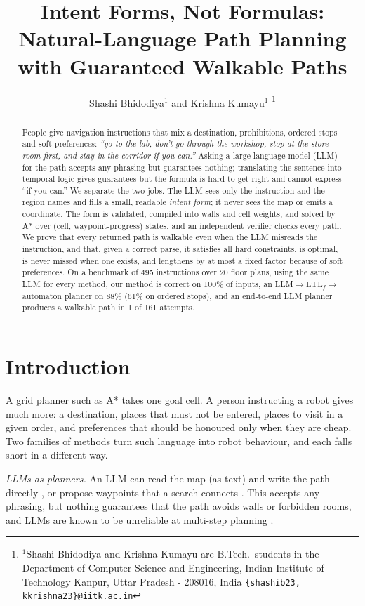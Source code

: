 \documentclass[letterpaper, 10 pt, conference]{ieeeconf}
\title{\LARGE \bf
Intent Forms, Not Formulas: Natural-Language Path Planning\\
with Guaranteed Walkable Paths
}
\author{Shashi Bhidodiya$^{1}$ and Krishna Kumayu$^{1}$%
\thanks{$^{1}$Shashi Bhidodiya and Krishna Kumayu are B.Tech.\ students in the
        Department of Computer Science and Engineering, Indian Institute of
        Technology Kanpur, Uttar Pradesh - 208016, India
        \mbox{\tt\small \{shashib23, kkrishna23\}@iitk.ac.in}}%
}
\newcommand{\Lt}{\mathrm{LTL}_f}
\begin{document}
\maketitle
\thispagestyle{empty}
\pagestyle{empty}

\begin{abstract}
People give navigation instructions that mix a destination, prohibitions, ordered
stops and soft preferences: \emph{``go to the lab, don't go through the workshop,
stop at the store room first, and stay in the corridor if you can.''} Asking a large
language model (LLM) for the path accepts any phrasing but guarantees nothing;
translating the sentence into temporal logic gives guarantees but the formula is hard
to get right and cannot express ``if you can.'' We separate the two jobs. The LLM sees
only the instruction and the region names and fills a small, readable \emph{intent
form}; it never sees the map or emits a coordinate. The form is validated, compiled
into walls and cell weights, and solved by A* over (cell, waypoint-progress) states,
and an independent verifier checks every path. We prove that every returned path is
walkable even when the LLM misreads the instruction, and that, given a correct parse,
it satisfies all hard constraints, is optimal, is never missed when one exists, and
lengthens by at most a fixed factor because of soft preferences. On a benchmark of 495
instructions over 20 floor plans, using the same LLM for every method, our method is
correct on 100\% of inputs, an LLM$\to\Lt\to$automaton planner on 88\% (61\% on
ordered stops), and an end-to-end LLM planner produces a walkable path in 1 of 161
attempts.
\end{abstract}

\section{Introduction}

A grid planner such as A* \cite{hart1968} takes one goal cell. A person instructing a
robot gives much more: a destination, places that must not be entered, places to
visit in a given order, and preferences that should be honoured only when they are
cheap. Two families of methods turn such language into robot behaviour, and each
falls short in a different way.

\emph{LLMs as planners.} An LLM can read the map (as text) and write the path
directly \cite{aghzal2023ppnl}, or propose waypoints that a search
connects \cite{meng2024llmastar}. This accepts any phrasing, but nothing guarantees that
the path avoids walls or forbidden rooms, and LLMs are known to be unreliable at
multi-step planning \cite{valmeekam2023,kambhampati2024}.
\end{document}
